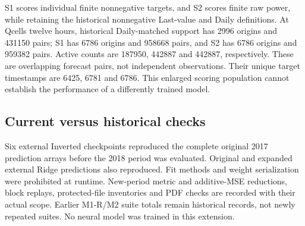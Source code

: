 S1 scores individual finite nonnegative targets, and S2 scores finite raw power, while retaining the historical nonnegative Last-value and Daily definitions. At Qcells twelve hours, historical Daily-matched support has 2996 origins and 431150 pairs; S1 has 6786 origins and 958668 pairs, and S2 has 6786 origins and 959382 pairs. Active counts are 187950, 442887 and 442887, respectively. These are overlapping forecast pairs, not independent observations. Their unique target timestamps are 6425, 6781 and 6786. This enlarged scoring population cannot establish the performance of a differently trained model.

\subsection{Current versus historical checks}
Six external Inverted checkpoints reproduced the complete original 2017 prediction arrays before the 2018 period was evaluated. Original and expanded external Ridge predictions also reproduced. Fit methods and weight serialization were prohibited at runtime. New-period metric and additive-MSE reductions, block replays, protected-file inventories and PDF checks are recorded with their actual scope. Earlier M1-R/M2 suite totals remain historical records, not newly repeated suites. No neural model was trained in this extension.
